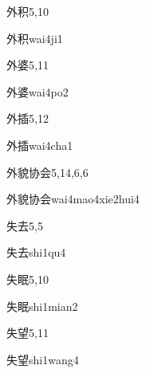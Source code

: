 \begin{entry}{外积}{5,10}
  \begin{phonetics}{外积}{wai4ji1}
  \end{phonetics}
\end{entry}

\begin{entry}{外婆}{5,11}
  \begin{phonetics}{外婆}{wai4po2}
  \end{phonetics}
\end{entry}

\begin{entry}{外插}{5,12}
  \begin{phonetics}{外插}{wai4cha1}
  \end{phonetics}
\end{entry}

\begin{entry}{外貌协会}{5,14,6,6}
  \begin{phonetics}{外貌协会}{wai4mao4xie2hui4}
  \end{phonetics}
\end{entry}

\begin{entry}{失去}{5,5}
  \begin{phonetics}{失去}{shi1qu4}
  \end{phonetics}
\end{entry}

\begin{entry}{失眠}{5,10}
  \begin{phonetics}{失眠}{shi1mian2}
  \end{phonetics}
\end{entry}

\begin{entry}{失望}{5,11}
  \begin{phonetics}{失望}{shi1wang4}
  \end{phonetics}
\end{entry}

